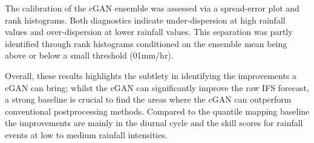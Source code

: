 \documentclass[../main.tex]{subfiles}
\begin{document}
The calibration of the cGAN ensemble was assessed via a spread-error plot and rank histograms. Both diagnostics indicate under-dispersion at high rainfall values and over-dispersion at lower rainfall values. This separation was partly identified through rank histograms conditioned on the ensemble mean being above or below a small threshold (01mm/hr).


Overall, these results highlights the subtlety in identifying the improvements a cGAN can bring; whilst the cGAN can significantly improve the raw IFS forecast, a strong baseline is crucial to find the areas where the cGAN can outperform conventional postprocessing methods. Compared to the quantile mapping baseline the improvements are mainly in the diurnal cycle and the skill scores for rainfall events at low to medium rainfall intensities. 




\ifSubfilesClassLoaded{%
    
    

}{}
\end{document}
